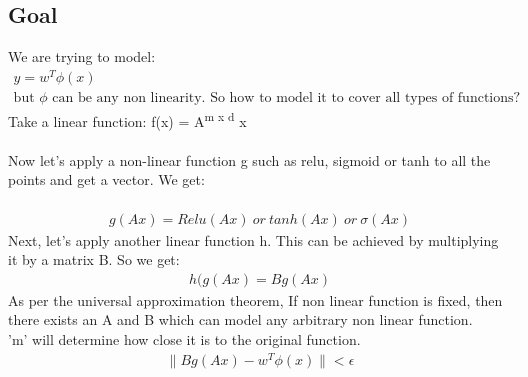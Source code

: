 \documentclass[12pt]{article}
\begin{document}
\subsection{Goal}
We are trying to model:
\begin{gather*}
        y = w^T \phi (x) \\
\text{but } \phi \text{ can be any non linearity. So how to model it to cover all types of functions?}
\end{gather*}
Take a linear function:
 f(x) = A\textsuperscript{m x d} x \\ \\
 Now let's apply a non-linear function g such as relu, sigmoid or tanh to all the points and get a vector. We get: \\ \\
\begin{gather*}
g(Ax) = Relu(Ax)\ or\ tanh(Ax)\ or\ \sigma (Ax)
\end{gather*}
Next, let's apply another linear function h. This can be achieved by multiplying it by a matrix B. So we get:
\begin{gather*}
h(g(Ax) = B g( Ax )
\end{gather*}
As per the universal approximation theorem, If non linear function is fixed, then there exists an A and B which can model any arbitrary non linear function.\\
'm' will determine how close it is to the original function.
\begin{gather*}
    \lVert B g(Ax) - w^T \phi(x) \rVert < \epsilon
\end{gather*}
\end{document}
